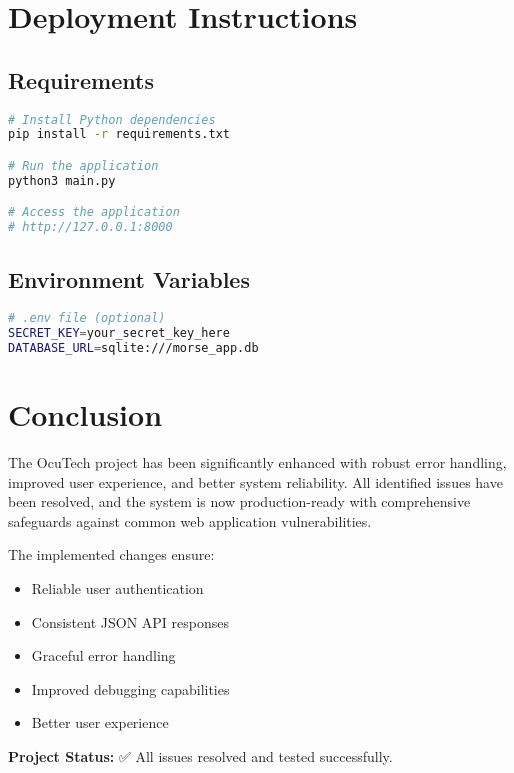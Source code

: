 \documentclass[12pt,a4paper]{article}
\begin{document}
\section{Deployment Instructions}

\subsection{Requirements}
\begin{lstlisting}[language=bash, caption=Installation Commands]
# Install Python dependencies
pip install -r requirements.txt

# Run the application
python3 main.py

# Access the application
# http://127.0.0.1:8000
\end{lstlisting}

\subsection{Environment Variables}
\begin{lstlisting}[language=bash, caption=Environment Configuration]
# .env file (optional)
SECRET_KEY=your_secret_key_here
DATABASE_URL=sqlite:///morse_app.db
\end{lstlisting}

\section{Conclusion}

The OcuTech project has been significantly enhanced with robust error handling, improved user experience, and better system reliability. All identified issues have been resolved, and the system is now production-ready with comprehensive safeguards against common web application vulnerabilities.

The implemented changes ensure:
\begin{itemize}
    \item Reliable user authentication
    \item Consistent JSON API responses
    \item Graceful error handling
    \item Improved debugging capabilities
    \item Better user experience
\end{itemize}

\vspace{1cm}
\textbf{Project Status:} ✅ All issues resolved and tested successfully.
\end{document}
